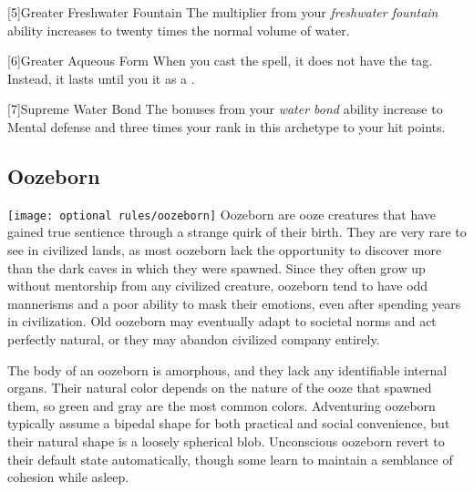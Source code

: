             [5]{Greater Freshwater Fountain} The multiplier from your \textit{freshwater fountain} ability increases to twenty times the normal volume of water.

            [6]{Greater Aqueous Form} When you cast the  spell, it does not have the  tag.
            Instead, it lasts until you  it as a .

            [7]{Supreme Water Bond} The bonuses from your \textit{water bond} ability increase to  Mental defense and three times your rank in this archetype to your hit points.

    \subsection{Oozeborn}
        \texttt{[image: optional rules/oozeborn]}
        Oozeborn are ooze creatures that have gained true sentience through a strange quirk of their birth.
        They are very rare to see in civilized lands, as most oozeborn lack the opportunity to discover more than the dark caves in which they were spawned.
        Since they often grow up without mentorship from any civilized creature, oozeborn tend to have odd mannerisms and a poor ability to mask their emotions, even after spending years in civilization.
        Old oozeborn may eventually adapt to societal norms and act perfectly natural, or they may abandon civilized company entirely.

        The body of an oozeborn is amorphous, and they lack any identifiable internal organs.
        Their natural color depends on the nature of the ooze that spawned them, so green and gray are the most common colors.
        Adventuring oozeborn typically assume a bipedal shape for both practical and social convenience, but their natural shape is a loosely spherical blob.
        Unconscious oozeborn revert to their default state automatically, though some learn to maintain a semblance of cohesion while asleep.

